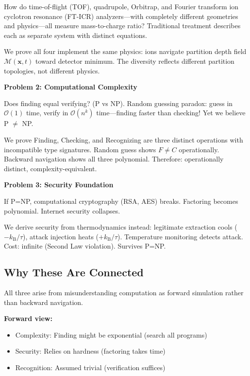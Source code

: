 \documentclass[twocolumn,10pt]{revtex4-2}
\theoremstyle{definition}
\theoremstyle{remark}
\newcommand{\kB}{k_{\mathrm{B}}}
\newcommand{\bigO}{\mathcal{O}}
\newcommand{\Mdepth}{\mathcal{M}}
\begin{document}
How do time-of-flight (TOF), quadrupole, Orbitrap, and Fourier transform ion cyclotron resonance (FT-ICR) analyzers—with completely different geometries and physics—all measure mass-to-charge ratio? Traditional treatment describes each as separate system with distinct equations.

We prove all four implement the same physics: ions navigate partition depth field $\Mdepth(\mathbf{x}, t)$ toward detector minimum. The diversity reflects different partition topologies, not different physics.

\vspace{0.2cm}
\noindent\textbf{Problem 2: Computational Complexity}

Does finding equal verifying? (P vs NP). Random guessing paradox: guess in $\bigO(1)$ time, verify in $\bigO(n^k)$ time—finding faster than checking! Yet we believe P $\neq$ NP.

We prove Finding, Checking, and Recognizing are three distinct operations with incompatible type signatures. Random guess shows $F \neq C$ operationally. Backward navigation shows all three polynomial. Therefore: operationally distinct, complexity-equivalent.

\vspace{0.2cm}
\noindent\textbf{Problem 3: Security Foundation}

If P=NP, computational cryptography (RSA, AES) breaks. Factoring becomes polynomial. Internet security collapses.

We derive security from thermodynamics instead: legitimate extraction cools ($-\kB/\tau$), attack injection heats ($+\kB/\tau$). Temperature monitoring detects attack. Cost: infinite (Second Law violation). Survives P=NP.

\subsection{Why These Are Connected}

All three arise from misunderstanding computation as forward simulation rather than backward navigation.

\textbf{Forward view:}
\begin{itemize}
\item Complexity: Finding might be exponential (search all programs)
\item Security: Relies on hardness (factoring takes time)
\item Recognition: Assumed trivial (verification suffices)
\end{itemize}
\end{document}
